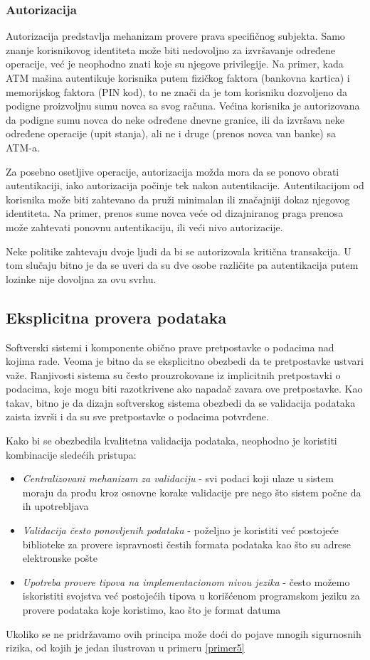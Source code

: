 \documentclass[a4paper]{article}
\begin{document}
\subsubsection{Autorizacija}
Autorizacija predstavlja mehanizam provere prava specifičnog subjekta.
Samo znanje korisnikovog identiteta može biti nedovoljno za izvršavanje određene operacije, već je neophodno znati koje su njegove privilegije.
Na primer, kada ATM mašina autentikuje korisnika putem fizičkog faktora (bankovna kartica) i memorijskog faktora (PIN kod),
to ne znači da je tom korisniku dozvoljeno da podigne proizvoljnu sumu novca sa svog računa. Većina korisnika je autorizovana 
da podigne sumu novca do neke određene dnevne granice, ili da izvršava neke određene operacije (upit stanja), 
ali ne i druge (prenos novca van banke) sa ATM-a.
 
Za posebno osetljive operacije, autorizacija možda mora da se ponovo obrati autentikaciji, iako autorizacija počinje tek 
nakon autentikacije. Autentikacijom od korisnika može biti zahtevano da pruži minimalan ili značajniji dokaz njegovog identiteta. 
Na primer, prenos sume novca veće od dizajniranog praga prenosa može zahtevati ponovnu autentikaciju, ili veći nivo autorizacije.

Neke politike zahtevaju dvoje ljudi da bi se autorizovala kritična transakcija. U tom slučaju 
bitno je da se uveri da su dve osobe različite pa autentikacija putem lozinke nije dovoljna za ovu svrhu.

\subsection{Eksplicitna provera podataka}
Softverski sistemi i komponente obično prave pretpostavke o podacima nad kojima rade. Veoma je bitno da se eksplicitno obezbedi da te pretpostavke ustvari važe. Ranjivosti sistema su često prouzrokovane iz implicitnih pretpostavki o podacima, koje mogu biti razotkrivene ako napadač zavara ove pretpostavke.
Kao takav, bitno je da dizajn softverskog sistema obezbedi da se validacija podataka zaista izvrši i da su sve 
pretpostavke o podacima potvrđene.

Kako bi se obezbedila kvalitetna validacija podataka, neophodno je koristiti kombinacije sledećih pristupa:
\begin{itemize}
 \item \textit{Centralizovani mehanizam za validaciju} - svi podaci koji ulaze u sistem moraju da prođu kroz osnovne korake validacije pre nego što sistem počne da ih upotrebljava
 \item \textit{Validacija često ponovljenih podataka} - poželjno je koristiti već postojeće biblioteke za provere ispravnosti čestih formata podataka kao što su adrese elektronske pošte
 \item \textit{Upotreba provere tipova na implementacionom nivou jezika} - često možemo iskoristiti svojstva već postojećih tipova u korišćenom programskom jeziku za provere podataka koje koristimo, kao što je format datuma
\end{itemize}
Ukoliko se ne pridržavamo ovih principa može doći do pojave mnogih sigurnosnih rizika, od kojih je jedan ilustrovan u primeru \ref{primer5}
\end{document}
